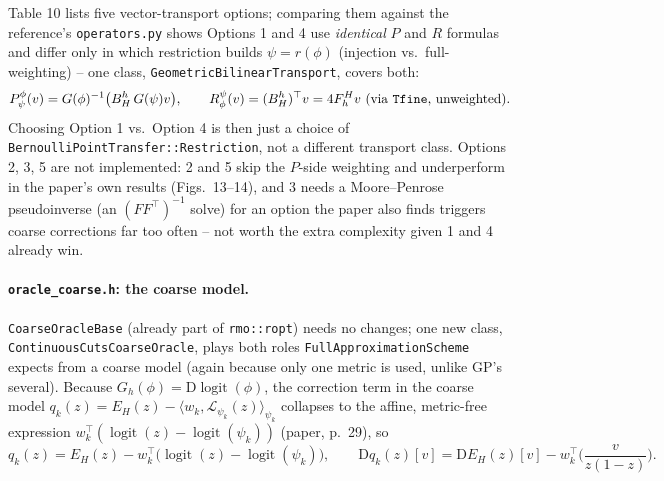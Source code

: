 \documentclass[11pt]{article}
\begin{document}
Table 10 lists five vector-transport options; comparing them against the reference's
\texttt{operators.py} shows Options 1 and 4 use \emph{identical} $P$ and $R$ formulas and
differ only in which restriction builds $\psi=r(\phi)$ (injection vs.\ full-weighting) --
one class, \texttt{GeometricBilinearTransport}, covers both:
\[
  P^\phi_\psi(v) = G(\phi)^{-1}\big(B_H^h\,G(\psi)v\big), \qquad
  R^\psi_\phi(v) = (B_H^h)^\top v = 4F_h^H v \ \text{(via \texttt{Tfine}, unweighted)}.
\]
Choosing Option 1 vs.\ Option 4 is then just a choice of
\texttt{BernoulliPointTransfer::Restriction}, not a different transport class. Options 2, 3,
5 are not implemented: 2 and 5 skip the $P$-side weighting and underperform in the paper's
own results (Figs.~13--14), and 3 needs a Moore--Penrose pseudoinverse (an
$(FF^\top)^{-1}$ solve) for an option the paper also finds triggers coarse corrections far
too often -- not worth the extra complexity given 1 and 4 already win.

\paragraph{\texttt{oracle\_coarse.h}: the coarse model.}
\label{sec:oracle-coarse-design}
\texttt{CoarseOracleBase} (already part of \texttt{rmo::ropt}) needs no changes; one new
class, \texttt{ContinuousCutsCoarseOracle}, plays both roles
\texttt{FullApproximationScheme} expects from a coarse model (again because only one metric
is used, unlike GP's several). Because
$G_h(\phi)=\mathrm D\operatorname{logit}(\phi)$, the correction term in the coarse model
$q_k(z) = E_H(z) - \langle w_k,\mathcal L_{\psi_k}(z)\rangle_{\psi_k}$ collapses to the
affine, metric-free expression $w_k^\top(\operatorname{logit}(z)-\operatorname{logit}(\psi_k))$
(paper, p.~29), so
\[
  q_k(z) = E_H(z) - w_k^\top\big(\operatorname{logit}(z)-\operatorname{logit}(\psi_k)\big), \qquad
  \mathrm Dq_k(z)[v] = \mathrm DE_H(z)[v] - w_k^\top\Big(\frac{v}{z(1-z)}\Big).
\]
\end{document}
